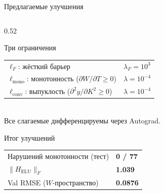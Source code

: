 \documentclass[11pt, aspectratio=169]{beamer}
\begin{document}
\begin{frame}[shrink=8]{Предлагаемые улучшения}
\begin{columns}[T]
\begin{column}{0.52\textwidth}
      \begin{alertblock}{\small Три ограничения}
        \scriptsize
        \begin{tabular}{@{}ll@{}}
          $\ell_F$: жёсткий барьер & $\lambda_F=10^3$ \\
          $\ell_{\text{mono}}$: монотонность ($\partial W/\partial T\ge0$) & $\lambda=10^{-4}$ \\
          $\ell_{\text{conv}}$: выпуклость ($\partial^2 y/\partial K^2\ge0$) & $\lambda=10^{-4}$ \\
        \end{tabular}\\[0.3em]
        Все слагаемые дифференцируемы через Autograd.
      \end{alertblock}

      \medskip
      \begin{block}{\small Итог улучшений}
        \scriptsize
        \begin{tabular}{@{}ll@{}}
          Нарушений монотонности (тест) & \textbf{0 / 77} \\
          $\|H_\text{ELU}\|_F$          & \textbf{1.039} \\
          Val RMSE ($W$-пространство)   & \textbf{0.0876} \\
        \end{tabular}
      \end{block}
    \end{column}
  \end{columns}
\end{frame}
\end{document}
